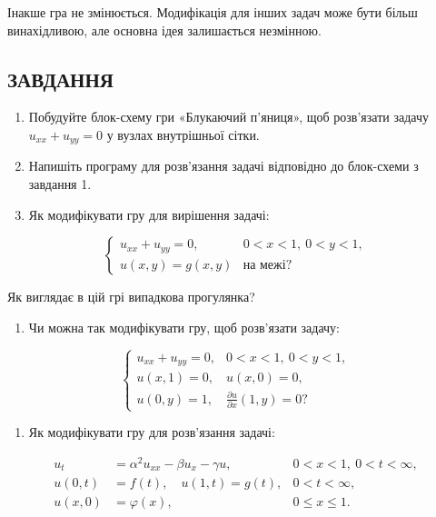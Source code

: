 \documentclass[
  ukrainian,
]{article}
\providecommand{\tightlist}{%
  \setlength{\itemsep}{0pt}\setlength{\parskip}{0pt}}
\begin{document}
Інакше гра не змінюється. Модифікація для інших задач може бути більш
винахідливою, але основна ідея залишається незмінною.

\subsection{ЗАВДАННЯ}\label{ux437ux430ux432ux434ux430ux43dux43dux44f-24}

\begin{enumerate}
\def\labelenumi{\arabic{enumi}.}
\item
  Побудуйте блок-схему гри «Блукаючий п'яниця», щоб розв'язати задачу
  \(u_{xx} + u_{yy} = 0\) у вузлах внутрішньої сітки.
\item
  Напишіть програму для розв'язання задачі відповідно до блок-схеми з
  завдання 1.
\item
  Як модифікувати гру для вирішення задачі:
\end{enumerate}

\[\begin{cases}u_{xx} + u_{yy} = 0, & 0 < x < 1,\ 0 < y < 1, \\u(x, y) = g(x, y) & \text{на межі?}\end{cases}\]

Як виглядає в цій грі випадкова прогулянка?

\begin{enumerate}
\def\labelenumi{\arabic{enumi}.}
\setcounter{enumi}{3}
\tightlist
\item
  Чи можна так модифікувати гру, щоб розв'язати задачу:
\end{enumerate}

\[\begin{cases}u_{xx} + u_{yy} = 0, & 0 < x < 1,\ 0 < y < 1, \\u(x, 1) = 0, & u(x, 0) = 0, \\u(0, y) = 1, & \tfrac{\partial u}{\partial x}(1, y) = 0?\end{cases}\]

\begin{enumerate}
\def\labelenumi{\arabic{enumi}.}
\setcounter{enumi}{4}
\tightlist
\item
  Як модифікувати гру для розв'язання задачі:
\end{enumerate}

\[\begin{aligned}u_t &= \alpha^2 u_{xx} - \beta u_x - \gamma u, & 0 < x < 1,\ 0 < t < \infty, \\u(0,t) &= f(t),\quad u(1,t) = g(t), & 0 < t < \infty, \\u(x,0) &= \varphi(x), & 0 \le x \le 1.\end{aligned}\]
\end{document}
